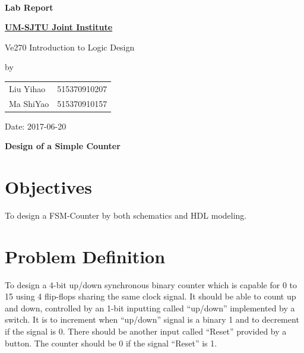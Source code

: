 \documentclass{article}
\date{}
\begin{document}
\vspace*{3mm}

\begin{minipage}{0.6\linewidth}
\ 
\end{minipage}
\hfill
\begin{minipage}{0.38\linewidth}
\begin{center}
\huge\bfseries
Lab Report \\[8mm]
\fontsize{100pt}{\baselineskip}
\end{center}
\end{minipage}

\vspace*{1cm}

{\huge\bfseries
\uline{UM-SJTU Joint Institute \phantom{xxxxxxxxxxxx}}
\vspace*{2mm}

Ve270 Introduction to Logic Design
}	

\vspace*{2cm}
\begin{center}
\LARGE
by \\[2mm]
\begin{tabular}{ll}
Liu Yihao & 515370910207 \\
Ma ShiYao & 515370910157
\end{tabular}

\vspace*{2cm}
Date: 2017-06-20
\end{center}

\vspace*{2cm}
\begin{center}
\Huge\bfseries
Design of a Simple Counter
\end{center}

\newpage

\section{Objectives}
To design a  FSM-Counter by both schematics and  HDL modeling.

\section{Problem Definition}
To design a  4-bit up/down synchronous binary counter which is capable for 0 to 15 using 4 flip-flops sharing the same clock signal. It should be able to count up and down, controlled by an 1-bit inputting called “up/down” implemented by a switch. It is to increment when “up/down” signal is a binary 1 and to decrement if the signal is 0. There should be another input called “Reset” provided by a button. The counter should be 0 if the signal “Reset” is 1.
\end{document}
